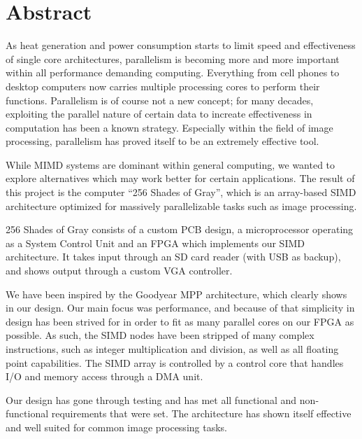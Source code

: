 \begingroup
\let\clearpage\relax
\let\cleardoublepage\relax
\let\cleardoublepage\relax

\chapter*{Abstract}
As heat generation and power consumption starts to limit speed and effectiveness
of single core architectures, parallelism is becoming more and more important
within all performance demanding computing. Everything from cell phones to
desktop computers now carries multiple processing cores to perform their
functions. Parallelism is of course not a new concept; for many decades,
exploiting the parallel nature of certain data to increate effectiveness in computation has
been a known strategy. Especially within the field of image processing,
parallelism has proved itself to be an extremely effective tool.

While \ac{MIMD} systems are dominant within general computing, we wanted to
explore alternatives which may work better for certain applications. The result
of this project is the computer ``256 Shades of Gray'', which is an array-based
\ac{SIMD} architecture optimized for massively parallelizable tasks such as
image processing.

256 Shades of Gray consists of a custom PCB design, a microprocessor operating
as a System Control Unit and an FPGA which implements our SIMD architecture. It
takes input through an SD card reader (with USB as backup), and shows output
through a custom VGA controller.

We have been inspired by the Goodyear MPP architecture, which clearly shows in
our design. Our main focus was performance, and because of that simplicity in
design has been strived for in order to fit as many parallel cores on our FPGA
as possible. As such, the SIMD nodes have been stripped of many
complex instructions, such as integer multiplication and division, as well as
all floating point capabilities. The SIMD array is controlled by a control core
that handles I/O and memory access through a DMA unit.

Our design has gone through testing and has met all functional and
non-functional requirements that were set. The architecture has shown itself
effective and well suited for common image processing tasks.
\endgroup
